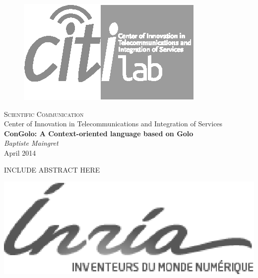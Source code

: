 \documentclass[a4paper]{article}
\begin{document}
%
%

\pagestyle{empty}
\begin{center}
\begin{figure}%
\centering
\includegraphics[width=0.4\columnwidth]{logo/citi-new-title-bw.eps}%
\end{figure}
{\LARGE \textsc{Scientific Communication}} \\ %
\vspace{0.5cm}
{Center of Innovation in Telecommunications and Integration of Services} \\ %
\vspace{2cm}
{\Large \textbf{ConGolo: A Context-oriented language based on Golo}} \\
\vspace{10pt}
{\large \textit{Baptiste Maingret}} \\
\vspace{10pt}
{\large April 2014} \\
\vspace{20pt}
\begin{minipage}{0.8\columnwidth}
\sffamily
\small
INCLUDE ABSTRACT HERE
\end{minipage}
\end{center}
\vfill
\begin{minipage}[b]{0.3\columnwidth}
\includegraphics[width=\columnwidth]{logo/inria.eps}%
\end{minipage}
\end{document}
